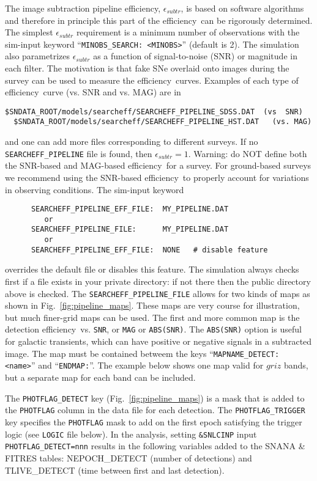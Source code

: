 \documentclass[12pt]{article}
\newcommand{\eff}{efficiency}
\newcommand{\simeffsub}{\epsilon_{subtr}}
\begin{document}
{The image subtraction pipeline \eff, $\simeffsub$,
is based on software algorithms and therefore
in principle this part of the \eff\ can be 
rigorously determined.
The simplest $\simeffsub$ requirement
is a minimum number of observations with
the sim-input keyword ``{\tt MINOBS\_SEARCH: <MINOBS>}''
(default is 2).
The simulation also parametrizes $\simeffsub$ as a function
of signal-to-noise (SNR) or magnitude in each filter.
The motivation is that fake SNe overlaid onto
images during the survey can be used to measure 
the \eff\ curves. Examples of each type of \eff\
curve (vs. SNR and vs. MAG) are in 
%
\begin{Verbatim}[frame=single]
  $SNDATA_ROOT/models/searcheff/SEARCHEFF_PIPELINE_SDSS.DAT  (vs  SNR)
  $SNDATA_ROOT/models/searcheff/SEARCHEFF_PIPELINE_HST.DAT   (vs. MAG)
\end{Verbatim}
and one can add more files corresponding to different surveys.
If no {\tt SEARCHEFF\_PIPELINE} file is found, then $\simeffsub=1$.
Warning: do NOT define both the SNR-based and MAG-based
\eff\ for a survey. For ground-based surveys we recommend
using the SNR-based \eff\ to properly account for variations
in observing conditions. The sim-input keyword
\begin{verbatim}
      SEARCHEFF_PIPELINE_EFF_FILE:  MY_PIPELINE.DAT
         or
      SEARCHEFF_PIPELINE_FILE:      MY_PIPELINE.DAT
         or
      SEARCHEFF_PIPELINE_EFF_FILE:  NONE   # disable feature
\end{verbatim}
%
overrides the default file or disables this feature.
The simulation always checks first if a file exists
in your private directory: if not there then the
public directory above is checked. 
The {\tt SEARCHEFF\_PIPELINE\_FILE} allows for two kinds
of maps as shown in Fig.~\ref{fig:pipeline_maps}.
These maps are very course for illustration, but
much finer-grid maps can be used.
The first and more common map is the detection \eff\
vs. {\tt SNR}, or {\tt MAG} or {\tt ABS(SNR)}.
The {\tt ABS(SNR)} option is useful for galactic transients,
which can have positive or negative signals in a subtracted image.
The map must be contained betweem the keys 
``{\tt MAPNAME\_DETECT: <name>}'' and ``{\tt ENDMAP:}''. 
The example below shows one map valid
for $griz$ bands, but a separate map for each band can be included.

The {\tt PHOTFLAG\_DETECT} key (Fig.~\ref{fig:pipeline_maps})
is a mask that is added to the {\tt PHOTFLAG} column in the data
file for each detection. The {\tt PHOTFLAG\_TRIGGER} key specifies
the {\tt PHOTFLAG} mask to add on the first epoch satisfying
the trigger logic (see {\tt LOGIC} file below).
In the analysis, setting {\tt \&SNLCINP} input 
{\tt PHOTFLAG\_DETECT=nnn} results in the following variables
added to the SNANA \& FITRES tables: 
{NEPOCH\_DETECT} (number of detections) and 
{TLIVE\_DETECT} (time between first and last detection).

}
\end{document}
